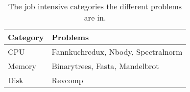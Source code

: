 \begin{table}[h]
\centering
\begin{tabular}{|l|l|}
\hline
\textbf{Category} & \textbf{Problems}                           \\ \hline
CPU      & Fannkuchredux, Nbody, Spectralnorm \\ \hline
Memory   & Binarytrees, Fasta, Mandelbrot     \\ \hline
Disk     & Revcomp                            \\ \hline
\end{tabular}
\caption{The job intensive categories the different problems are in.}
\label{tab:problems}
\end{table}




